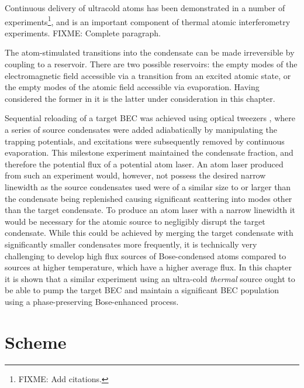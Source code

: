 Continuous delivery of ultracold atoms has been demonstrated in a number of experiments\footnote{FIXME: Add citations.}, and is an important component of thermal atomic interferometry experiments. FIXME: Complete paragraph.

The atom-stimulated transitions into the condensate can be made irreversible by coupling to a reservoir. There are two possible reservoirs: the empty modes of the electromagnetic field accessible via a transition from an excited atomic state, or the empty modes of the atomic field accessible via evaporation. Having considered the former in  it is the latter under consideration in this chapter.

Sequential reloading of a target BEC was achieved using optical tweezers \citep{Chikkatur:2002qa}, where a series of source condensates were added adiabatically by manipulating the trapping potentials, and excitations were subsequently removed by continuous evaporation. This milestone experiment maintained the condensate fraction, and therefore the potential flux of a potential atom laser. An atom laser produced from such an experiment would, however, not possess the desired narrow linewidth as the source condensates used were of a similar size to or larger than the condensate being replenished causing significant scattering into modes other than the target condensate. To produce an atom laser with a narrow linewidth it would be necessary for the atomic source to negligibly disrupt the target condensate. While this could be achieved by merging the target condensate with significantly smaller condensates more frequently, it is technically very challenging to develop high flux sources of Bose-condensed atoms compared to sources at higher temperature, which have a higher average flux. In this chapter it is shown that a similar experiment using an ultra-cold \emph{thermal} source ought to be able to pump the target BEC and maintain a significant BEC population using a phase-preserving Bose-enhanced process.


\section{Scheme}
\label{KineticTheory:Scheme}

